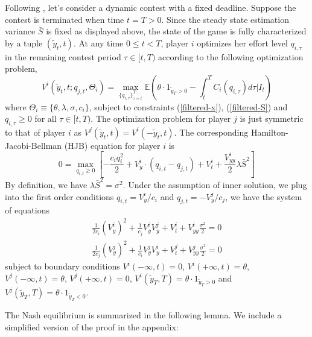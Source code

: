 \documentclass[mnsc]{informs3}
\begin{document}
Following \cite{ryvkin2022fight}, let's consider a dynamic contest with a fixed deadline. 
Suppose the contest is terminated when time $t=T>0$. 
Since the steady state estimation variance $\bar{S}$ is fixed as displayed above, the state of the game is fully characterized by a tuple $(\tilde{y}_t, t)$. 
At any time $0\le t<T$, player $i$ optimizes her effort level $q_{i,\tau}$ in the remaining contest period $\tau\in[t, T)$ according to the following optimization problem, 
\begin{equation}\label{v-def}
	V^i(\tilde{y}_{t}, t ; q_{j,t},\Theta_i) = \max_{\{q_{i,\tau}\}^T_{\tau=t}} 
	\mathbb{E}\left( \theta\cdot1_{\tilde{y}_T>0} - \int^T_tC_i(q_{i,\tau})d\tau \bigg|I_t\right) 
\end{equation}
where $\Theta_i \equiv\{\theta, \lambda, \sigma, c_i\}$, subject to constraints (\ref{filtered-x}), (\ref{filtered-S}) and $q_{i,\tau}\ge0$ for all $\tau\in[t,T)$.
The optimization problem for player $j$ is just symmetric to that of player $i$ as $V^j(\tilde{y}_t, t) = V^i(-\tilde{y}_t, t)$. 
The corresponding Hamilton-Jacobi-Bellman (HJB) equation for player $i$ is 
\begin{equation*}
0 = \max_{q_{i,t}\ge0}\left[-\frac{c_iq_i^2}{2} + V^i_{y}\cdot\left(q_{i,t}-q_{j,t}\right)+V^i_t + \frac{V^i_{yy}}{2}\lambda \bar{S}^2\right]
\end{equation*}
By definition, we have $\lambda \bar{S}^2 = \sigma^2$. 
Under the assumption of inner solution, we plug into the first order conditions $q_{i,t} = V^i_y/c_i$ and $q_{j,t} = -V^j_y/c_j$, we have the system of equations
\begin{equation*}
\begin{aligned}
\frac{1}{2c_i}(V^i_y)^2 + \frac{1}{c_j}V^i_yV^j_y + V^i_t + V^i_{yy}\frac{\sigma^2}{2} = 0\\
\frac{1}{2c_j}(V^j_y)^2 + \frac{1}{c_i}V^j_yV^i_y + V^j_t + V^j_{yy}\frac{\sigma^2}{2} = 0
\end{aligned}
\end{equation*}
subject to boundary conditions $V^i(-\infty, t) = 0$, $V^i(+\infty, t) = \theta$, $V^j(-\infty, t) = \theta$, $V^j(+\infty, t)=0$, $V^i(\tilde{y}_T, T) = \theta \cdot 1_{\tilde{y}_T > 0}$ and $V^j(\tilde{y}_T, T) = \theta \cdot 1_{\tilde{y}_T < 0}$. 


The Nash equilibrium is summarized in the following lemma. 
We include a simplified version of the proof in the appendix: 
\end{document}

